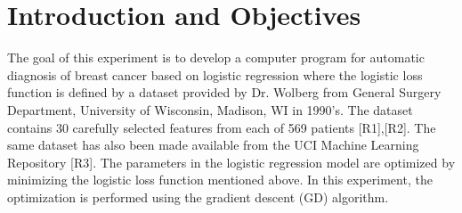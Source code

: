 \section{Introduction and Objectives}
\label{sect:introduction}
The goal of this experiment is to develop a computer program for automatic diagnosis of breast
cancer based on logistic regression where the logistic loss function is defined by a dataset
provided by Dr. Wolberg from General Surgery Department, University of Wisconsin,
Madison, WI in 1990’s. The dataset contains 30 carefully selected features from each of 569
patients [R1],[R2]. The same dataset has also been made available from the UCI Machine
Learning Repository [R3]. The parameters in the logistic regression model are optimized by
minimizing the logistic loss function mentioned above. In this experiment, the optimization is
performed using the gradient descent (GD) algorithm.